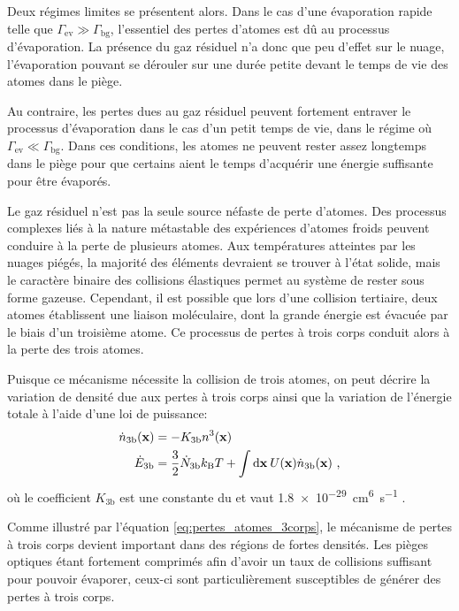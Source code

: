Deux régimes limites se présentent alors. Dans le cas d'une évaporation rapide telle que $\Gamma_{\mathrm{ev}} \gg \Gamma_{\mathrm{bg}}$, l'essentiel des pertes d'atomes est dû au processus d'évaporation. La présence du gaz résiduel n'a donc que peu d'effet sur le nuage, l'évaporation pouvant se dérouler sur une durée petite devant le temps de vie des atomes dans le piège. 

Au contraire, les pertes dues au gaz résiduel peuvent fortement entraver le processus d'évaporation dans le cas d'un petit temps de vie, dans le régime où $\Gamma_{\mathrm{ev}} \ll \Gamma_{\mathrm{bg}}$. Dans ces conditions, les atomes ne peuvent rester assez longtemps dans le piège pour que certains aient le temps d'acquérir une énergie suffisante pour être évaporés.



Le gaz résiduel n'est pas la seule source néfaste de perte d'atomes. Des processus complexes liés à la nature métastable des expériences d'atomes froids peuvent conduire à la perte de plusieurs atomes. Aux températures atteintes par les nuages piégés, la majorité des éléments devraient se trouver à l'état solide, mais le caractère binaire des collisions élastiques permet au système de rester sous forme gazeuse. Cependant, il est possible que lors d'une collision tertiaire, deux atomes établissent une liaison moléculaire, dont la grande énergie est évacuée par le biais d'un troisième atome. Ce processus de pertes à trois corps conduit alors à la perte des trois atomes. 

Puisque ce mécanisme nécessite la collision de trois atomes, on peut décrire la variation de densité due aux pertes à trois corps ainsi que la variation de l'énergie totale à l'aide d'une loi de puissance:
\begin{align}
\dot{n}_{\mathrm{3b}}(\mathbf{x})&=-K_{\mathrm{3b}} n^3(\mathbf{x}) \label{eq:pertes_atomes_3corps} \\
\dot{E}_{\mathrm{3b}}&= \frac{3}{2}\dot{N}_{\mathrm{3b}} k_{\mathrm{B}} T + \int{\mathrm{d}\mathbf{x} \: U(\mathbf{x}) \dot{n}_{\mathrm{3b}}(\mathbf{x})}\text{ ,}
\end{align}
où le coefficient $K_{\mathrm{3b}}$ est une constante du  et vaut \SI{1.8e-29}{\centi\metre^6\second^{-1}} \citep{burt1997coherence}\citep{soding1999three}.


Comme illustré par l'équation \ref{eq:pertes_atomes_3corps}, le mécanisme de pertes à trois corps devient important dans des régions de fortes densités. Les pièges optiques étant fortement comprimés afin d'avoir un taux de collisions suffisant pour pouvoir évaporer, ceux-ci sont particulièrement susceptibles de générer des pertes à trois corps. 

